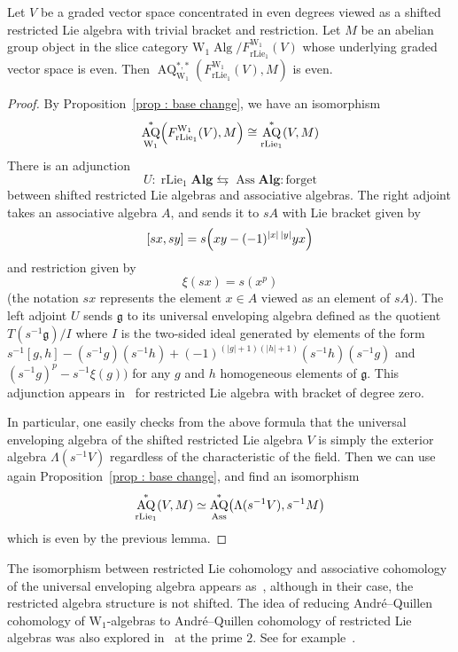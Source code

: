\documentclass[AHL,Unicode,longabstracts,published]{cedram}
\DeclareMathOperator{\Ass}{Ass}
\DeclareMathOperator{\Alg}{Alg}
\DeclareMathOperator{\AQ}{AQ}
\DeclareMathOperator{\rlie}{rLie}
\newcommand{\alg}{\mathbf{Alg}}
\newcommand{\W}{\mathrm{W}}
\newcommand{\fkg}{\mathfrak{g}}
\let\originalleft\left
\let\originalright\right
\renewcommand{\left}{\mathopen{}\mathclose\bgroup\originalleft}
\renewcommand{\right}{\aftergroup\egroup\originalright}
\begin{document}
\begin{lemm}\label{lemm : main computation}

Let $V$ be a graded vector space concentrated in even degrees viewed as a shifted restricted Lie algebra with trivial bracket and restriction. Let $M$ be an abelian group object in the slice category $\W_1\Alg/F_{\rlie_1}^{\W_1}(V)$ whose underlying graded vector space is even. Then $\AQ^{*,*}_{\W_1}(F_{\rlie_1}^{\W_1}(V),M)$ is even.
\end{lemm}

\begin{proof}
By Proposition~\ref{prop : base change}, we have an isomorphism
\[
\AQ^*_{\W_1}\left(F_{\rlie_1}^{\W_1}(V),M\right)\cong \AQ^*_{\rlie_1}(V,M)
\]
There is an adjunction
\[
U:\rlie_1\alg\leftrightarrows \Ass\alg:\text{forget}
\]
between shifted restricted Lie algebras and associative algebras. The right adjoint takes an associative algebra $A$, and sends it to $sA$ with Lie bracket given by
\[
[sx,sy]=s\left(xy-(-1)^{|x|\,|y|}yx\right)
\]
and restriction given by
\[
\xi(sx)=s(x^p)
\]
(the notation $sx$ represents the element $x\in A$ viewed as an element of $sA$). The left adjoint $U$ sends $\fkg$ to its universal enveloping algebra defined as the quotient $T(s^{-1}\fkg)/I$ where $I$ is the two-sided ideal generated by elements of the form $s^{-1}[g,h]-(s^{-1}g)(s^{-1}h)+(-1)^{(|g|+1)(|h|+1)}(s^{-1}h)(s^{-1}g)$ and $(s^{-1}g)^p-s^{-1}\xi(g))$ for any $g$ and $h$ homogeneous elements of $\fkg$. This adjunction appears in~\cite[Chapter~V, Theorem~12]{jacobson} for restricted Lie algebra with bracket of degree zero.


In particular, one easily checks from the above formula that the universal enveloping algebra of the shifted restricted Lie algebra $V$ is simply the exterior algebra $\Lambda(s^{-1}V)$ regardless of the characteristic of the field. Then we can use again Proposition~\ref{prop : base change}, and find an isomorphism
\[
\AQ^*_{\rlie_1}(V,M)\simeq\AQ_{\Ass}^*\left(\Lambda(s^{-1}V),s^{-1}M\right)
\]
which is even by the previous lemma.
\end{proof}

\begin{rema}
The isomorphism between restricted Lie cohomology and associative cohomology of the universal enveloping algebra appears as~\cite[Theorem~14.2]{dokasquillencohomologydividedpower}, although in their case, the restricted algebra structure is not shifted. The idea of reducing André--Quillen cohomology of $\W_1$-algebras to André--Quillen cohomology of restricted Lie algebras was also explored in~\cite{richterspectral} at the prime $2$. See for example~\cite[Proposition~7.4]{richterspectral}.
\end{rema}
\end{document}
